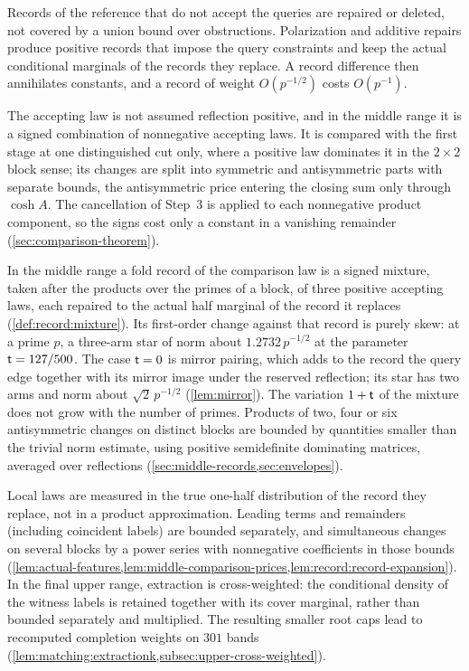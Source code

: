 \begin{description}[leftmargin=2.2em,style=nextline]
\item[Non-forcing records are replaced or deleted, not bounded by a union bound]
Records of the reference that do not accept the queries are repaired or
deleted, not covered by a union bound over obstructions. Polarization and
additive repairs produce positive records that impose the query
constraints and keep the actual conditional marginals of the records they
replace. A record difference then annihilates constants, and a record of
weight $O(p^{-1/2})$ costs $O(p^{-1})$.

\item[A comparison law that is not reflection positive]
The accepting law is not assumed reflection positive, and in the middle
range it is a signed combination of nonnegative accepting laws. It is
compared with the first stage at one distinguished cut only, where
a positive law dominates it in the $2\times2$ block sense; its
changes are split into symmetric and antisymmetric parts with
separate bounds, the antisymmetric price entering the closing sum
only through $\cosh A$. The cancellation of Step~3 is applied to each
nonnegative product component, so the signs cost only a constant in a
vanishing remainder (\cref{sec:comparison-theorem}).

\item[Signed whole-block laws and positive envelopes]
In the middle range a fold record of the comparison law is a signed
mixture, taken after the products over the primes of a block, of three
positive accepting laws, each repaired to the actual half marginal of the
record it replaces (\cref{def:record:mixture}). Its first-order change
against that record is purely skew: at a prime $p$, a three-arm star of
norm about $1.2732\,p^{-1/2}$ at the parameter $\mathsf t=127/500$. The case
$\mathsf t=0$ is mirror pairing, which adds to the record the query edge
together with its mirror image under the reserved reflection; its star has
two arms and norm about $\sqrt2\,p^{-1/2}$ (\cref{lem:mirror}). The
variation $1+\mathsf t$ of the mixture
does not grow with the number of primes.
Products of two, four or six antisymmetric changes on distinct
blocks are bounded by quantities smaller than the trivial norm
estimate, using positive semidefinite dominating matrices,
averaged over reflections
(\cref{sec:middle-records,sec:envelopes}).

\item[Norms are taken in the marginals of the record being replaced]
Local laws are measured in the true one-half distribution of the
record they replace, not in a product approximation. Leading terms
and remainders (including coincident labels) are bounded
separately, and simultaneous changes on several blocks by a power
series with nonnegative coefficients in those bounds
(\cref{lem:actual-features,lem:middle-comparison-prices,lem:record:record-expansion}).
In the final upper range, extraction is cross-weighted: the conditional
density of the witness labels is retained together with its cover
marginal, rather than bounded separately and multiplied. The resulting
smaller root caps lead to recomputed completion weights on $301$ bands
(\cref{lem:matching:extractionk,subsec:upper-cross-weighted}).


\end{description}
